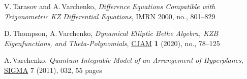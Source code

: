 \documentclass[12pt]{amsart}
\numberwithin{equation}{section}
\theoremstyle{definition}
\let\bi\bibitem
\begin{document}
\begin{thebibliography}{[COGP]}
\bi[TV]{TV}
V.\,Tarasov and A.\,Varchenko,  {\it Difference Equations Compatible with Trigonometric KZ Differential Equations}, \href{https://doi.org/10.1155/S1073792800000441}{IMRN} 2000, no., 801--829


\bi[ThV]{ThV} D.\,Thompson, A.\,Varchenko, {\it Dynamical Elliptic Bethe Algebra, KZB Eigenfunctions, and Theta-Polynomials},
\href{https://www.prior-sci-pub.com/lims_2019art6.html} {CJAM} {\bf 1} (2020), no., 78--125 

\bi[V]{V} A.\,Varchenko, {\it Quantum Integrable Model of an Arrangement of Hyperplanes}, \href{https://doi.org/10.3842/SIGMA.2011.032}{SIGMA} 7 (2011), 032, 55 pages

\end{thebibliography}
\end{document}
